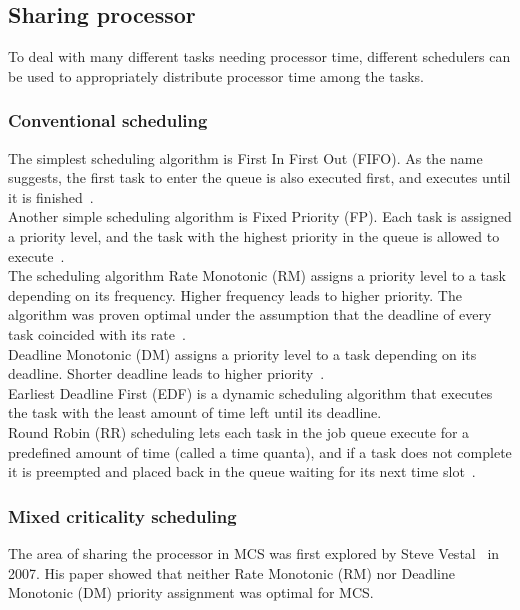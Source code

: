 \subsection{Sharing processor}
To deal with many different tasks needing processor time, different schedulers can be used to appropriately distribute processor time among the tasks.

\subsubsection{Conventional scheduling}
The simplest scheduling algorithm is First In First Out (FIFO). As the name suggests, the first task to enter the queue is also executed first, and executes until it is finished~\cite{remzi2015}.\\

Another simple scheduling algorithm is Fixed Priority (FP). Each task is assigned a priority level, and the task with the highest priority in the queue is allowed to execute~\cite{liulayland1973}.\\

The scheduling algorithm Rate Monotonic (RM) assigns a priority level to a task depending on its frequency. Higher frequency leads to higher priority. The algorithm was proven optimal under the assumption that the deadline of every task coincided with its rate~\cite{liulayland1973}.\\

Deadline Monotonic (DM) assigns a priority level to a task depending on its deadline. Shorter deadline leads to higher priority~\cite{liulayland1973}.\\

Earliest Deadline First (EDF) is a dynamic scheduling algorithm that executes the task with the least amount of time left until its deadline.\\

Round Robin (RR) scheduling lets each task in the job queue execute for a predefined amount of time (called a time quanta), and if a task does not complete it is preempted and placed back in the queue waiting for its next time slot~\cite{kleinrock1964}.

\subsubsection{Mixed criticality scheduling}
The area of sharing the processor in MCS was first explored by Steve Vestal~\cite{vestal2007} in 2007. His paper showed that neither Rate Monotonic (RM) nor Deadline Monotonic (DM) priority assignment was optimal for MCS.%

